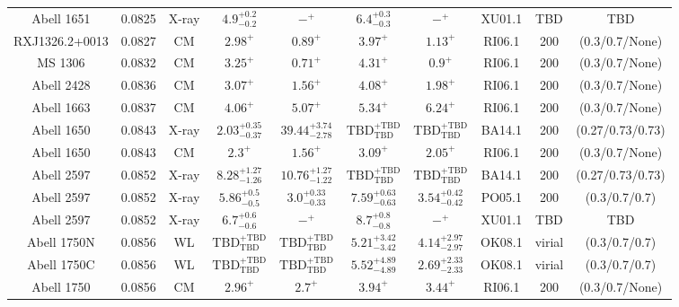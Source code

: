 \begin{table}
\begin{tabular}{cccccccccc}
Abell 1651 & 0.0825 & X-ray & ${4.9}^{+0.2}_{-0.2}$ & ${-}^{+}_{}$ & ${6.4}^{+0.3}_{-0.3}$ & ${-}^{+}_{}$ & XU01.1 & TBD & TBD \\
RXJ1326.2+0013 & 0.0827 & CM & ${2.98}^{+}_{}$ & ${0.89}^{+}_{}$ & ${3.97}^{+}_{}$ & ${1.13}^{+}_{}$ & RI06.1 & 200 & (0.3/0.7/None) \\
MS 1306 & 0.0832 & CM & ${3.25}^{+}_{}$ & ${0.71}^{+}_{}$ & ${4.31}^{+}_{}$ & ${0.9}^{+}_{}$ & RI06.1 & 200 & (0.3/0.7/None) \\
Abell 2428 & 0.0836 & CM & ${3.07}^{+}_{}$ & ${1.56}^{+}_{}$ & ${4.08}^{+}_{}$ & ${1.98}^{+}_{}$ & RI06.1 & 200 & (0.3/0.7/None) \\
Abell 1663 & 0.0837 & CM & ${4.06}^{+}_{}$ & ${5.07}^{+}_{}$ & ${5.34}^{+}_{}$ & ${6.24}^{+}_{}$ & RI06.1 & 200 & (0.3/0.7/None) \\
Abell 1650 & 0.0843 & X-ray & ${2.03}^{+0.35}_{-0.37}$ & ${39.44}^{+3.74}_{-2.78}$ & ${\mathrm{TBD}}^{+\mathrm{TBD}}_{\mathrm{TBD}}$ & ${\mathrm{TBD}}^{+\mathrm{TBD}}_{\mathrm{TBD}}$ & BA14.1 & 200 & (0.27/0.73/0.73) \\
Abell 1650 & 0.0843 & CM & ${2.3}^{+}_{}$ & ${1.56}^{+}_{}$ & ${3.09}^{+}_{}$ & ${2.05}^{+}_{}$ & RI06.1 & 200 & (0.3/0.7/None) \\
Abell 2597 & 0.0852 & X-ray & ${8.28}^{+1.27}_{-1.26}$ & ${10.76}^{+1.27}_{-1.22}$ & ${\mathrm{TBD}}^{+\mathrm{TBD}}_{\mathrm{TBD}}$ & ${\mathrm{TBD}}^{+\mathrm{TBD}}_{\mathrm{TBD}}$ & BA14.1 & 200 & (0.27/0.73/0.73) \\
Abell 2597 & 0.0852 & X-ray & ${5.86}^{+0.5}_{-0.5}$ & ${3.0}^{+0.33}_{-0.33}$ & ${7.59}^{+0.63}_{-0.63}$ & ${3.54}^{+0.42}_{-0.42}$ & PO05.1 & 200 & (0.3/0.7/0.7) \\
Abell 2597 & 0.0852 & X-ray & ${6.7}^{+0.6}_{-0.6}$ & ${-}^{+}_{}$ & ${8.7}^{+0.8}_{-0.8}$ & ${-}^{+}_{}$ & XU01.1 & TBD & TBD \\
Abell 1750N & 0.0856 & WL & ${\mathrm{TBD}}^{+\mathrm{TBD}}_{\mathrm{TBD}}$ & ${\mathrm{TBD}}^{+\mathrm{TBD}}_{\mathrm{TBD}}$ & ${5.21}^{+3.42}_{-3.42}$ & ${4.14}^{+2.97}_{-2.97}$ & OK08.1 & virial & (0.3/0.7/0.7) \\
Abell 1750C & 0.0856 & WL & ${\mathrm{TBD}}^{+\mathrm{TBD}}_{\mathrm{TBD}}$ & ${\mathrm{TBD}}^{+\mathrm{TBD}}_{\mathrm{TBD}}$ & ${5.52}^{+4.89}_{-4.89}$ & ${2.69}^{+2.33}_{-2.33}$ & OK08.1 & virial & (0.3/0.7/0.7) \\
Abell 1750 & 0.0856 & CM & ${2.96}^{+}_{}$ & ${2.7}^{+}_{}$ & ${3.94}^{+}_{}$ & ${3.44}^{+}_{}$ & RI06.1 & 200 & (0.3/0.7/None) \\

\end{tabular}
\end{table}
